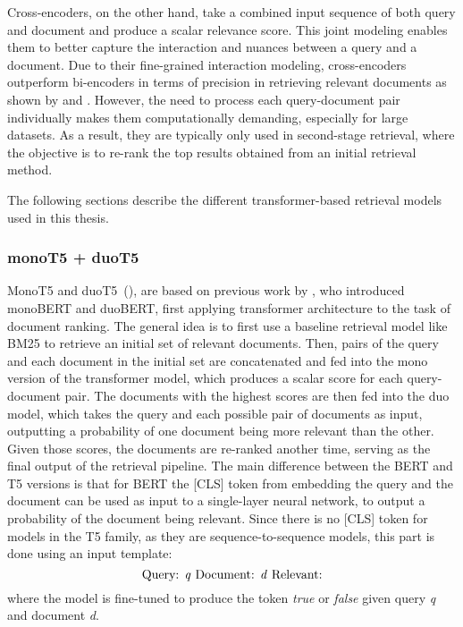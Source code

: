 Cross-encoders, on the other hand, take a combined input sequence of both query and document and produce a scalar relevance score.
This joint modeling enables them to better capture the interaction and nuances between a query and a document.
Due to their fine-grained interaction modeling, cross-encoders outperform bi-encoders in terms of precision in retrieving relevant documents as shown by \cite{thakur:2020:Augmented} and \cite{rosa:2022:In}.
However, the need to process each query-document pair individually makes them computationally demanding, especially for large datasets.
As a result, they are typically only used in second-stage retrieval, where the objective is to re-rank the top results obtained from an initial retrieval method.

The following sections describe the different transformer-based retrieval models used in this thesis.
\subsubsection{monoT5 + duoT5}\label{sec:monoT5-duoT5}
MonoT5 and duoT5~(\cite{roberts:2019:Exploring}), are based on previous work by \cite{nogueira:2019:Multi}, who introduced monoBERT and duoBERT, first applying transformer architecture to the task of document ranking.
The general idea is to first use a baseline retrieval model like BM25 to retrieve an initial set of relevant documents.
Then, pairs of the query and each document in the initial set are concatenated and fed into the mono version of the transformer model, which produces a scalar score for each query-document pair.
The documents with the highest scores are then fed into the duo model, which takes the query and each possible pair of documents as input, outputting a probability of one document being more relevant than the other.
Given those scores, the documents are re-ranked another time, serving as the final output of the retrieval pipeline.
The main difference between the BERT and T5 versions is that for BERT the [CLS] token from embedding the query and the document can be used as input to a single-layer neural network, to output a probability of the document being relevant.
Since there is no [CLS] token for models in the T5 family, as they are sequence-to-sequence models, this part is done using an input template:
\begin{equation}
    \text{Query: \emph{q} Document: \emph{d} Relevant:}
\end{equation} 
where the model is fine-tuned to produce the token \emph{true} or \emph{false} given query \emph{q} and document \emph{d}.


